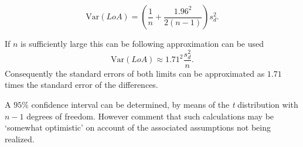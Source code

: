 \documentclass[Chap2main.tex]{subfiles}
\begin{document}
\[
\mbox{Var}(LoA) = (\frac{1}{n}+\frac{1.96^{2}}{2(n-1)})s_{d}^{2}.
\]

If $n$ is sufficiently large this can be following approximation
can be used
\[
\mbox{Var}(LoA) \approx 1.71^{2}\frac{s_{d}^{2}}{n}.
\]
Consequently the standard errors of both limits can be
approximated as $1.71$ times the standard error of the
differences.

A $95\%$ confidence interval can be determined, by means of the
\emph{t} distribution with $n-1$ degrees of freedom. However \citet*{BA99} comment that such calculations  may be `somewhat optimistic' on account of the associated assumptions not being realized.





\end{document}
